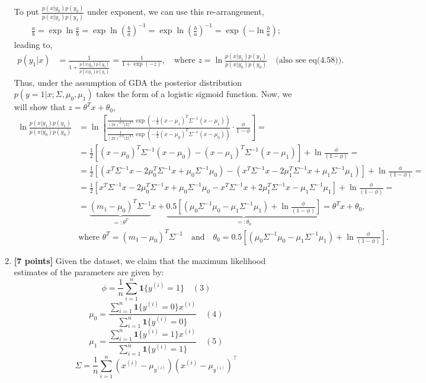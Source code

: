 \documentclass{article}
\begin{document}
\begin{enumerate}[label=\alph*)]
To put $ \frac{p(x|y_0)p(y_0)}{p(x|y_1)p(y_1)}$ under exponent, we can use this re-arrangement, 
 \begin{align*}
     \frac{a}{b} = \exp\ln\frac{a}{b} = \exp\ln\left(\frac{b}{a}\right)^{-1} = \exp\ln\left(\frac{b}{a}\right)^{-1} = \exp\left(-\ln\frac{b}{a}\right);
 \end{align*}
 leading to,
 \begin{align*}
    p(y_1 |x) & =\frac{1}{1+ \frac{p(x|y_0)p(y_0)}{p(x|y_1)p(y_1)}} = \frac{1}{1+\exp(-z)}, \quad\mbox{where } z = \ln\frac{p(x|y_1)p(y_1)}{p(x|y_0)p(y_0)}\quad \mbox{(also see eq(4.58))}.
\end{align*}
 Thus, under the assumption of GDA the posterior distribution $p(y = 1|x; \Sigma, \mu_0, \mu_1)$ takes the form of a logistic sigmoid function. Now, we will show that $z=\theta^Tx +\theta_0$,
\begin{align*}
    \ln\frac{p(x|y_1)p(y_1)}{p(x|y_0)p(y_0)} &= \ln\left[\frac{ \frac{1}{{(2\pi)^{d/2} |\Sigma|^{0.5}}} \exp\left(-\frac{1}{2}(x-\mu_1)^T \Sigma^{-1}(x-\mu_1)\right)}{\frac{1}{{(2\pi)^{d/2} |\Sigma|^{0.5}}} \exp\left(-\frac{1}{2}(x-\mu_0)^T \Sigma^{-1}(x-\mu_0)\right)}\cdot \frac{\phi}{1-\phi} \right]= \\[10pt]
    & = \frac{1}{2}\left[(x-\mu_0)^T\Sigma^{-1}(x-\mu_0) - (x-\mu_1)^T\Sigma^{-1}(x-\mu_1)\right] + \ln\frac{\phi}{(1-\phi)} = \\[10pt]
    & = \frac{1}{2}\left[(x^T\Sigma^{-1}x - 2\mu_0^T\Sigma^{-1}x + \mu_0\Sigma^{-1}\mu_0) - (x^T\Sigma^{-1}x - 2\mu_1^T\Sigma^{-1}x + \mu_1\Sigma^{-1}\mu_1)\right] + \ln\frac{\phi}{(1-\phi)}=\\[10pt]
    &= \frac{1}{2}\left[x^T\Sigma^{-1}x - 2\mu_0^T\Sigma^{-1}x + \mu_0\Sigma^{-1}\mu_0 - x^T\Sigma^{-1}x + 2\mu_1^T\Sigma^{-1}x - \mu_1\Sigma^{-1}\mu_1\right] +\ln\frac{\phi}{(1-\phi)}=\\[10pt]
    &=\underbrace{(m_1-\mu_0)^T\Sigma^{-1}}_{=:\theta^T}x + \underbrace{0.5\left[(\mu_0\Sigma^{-1}\mu_0 - \mu_1\Sigma^{-1}\mu_1) +  \ln\frac{\phi}{(1-\phi)}\right]}_{=:\theta_0}= \theta^Tx + \theta_0,\\[10pt]
    &\mbox{where } \boxed{\theta^T = (m_1-\mu_0)^T\Sigma^{-1}}\quad\mbox{and}\quad \boxed{\theta_0 = 0.5\left[(\mu_0\Sigma^{-1}\mu_0 - \mu_1\Sigma^{-1}\mu_1) +  \ln\frac{\phi}{(1-\phi)}\right].}
\end{align*}





\item \textbf{[7 points]} Given the dataset, we claim that the maximum likelihood estimates of the parameters are given by:
\[ \phi = \frac{1}{n} \sum_{i=1}^{n} \mathbf{1}\{y^{(i)} = 1\} \quad (3) \]
\[ \mu_0 = \frac{\sum_{i=1}^{n} \mathbf{1}\{y^{(i)} = 0\} x^{(i)}}{\sum_{i=1}^{n} \mathbf{1}\{y^{(i)} = 0\}} \quad (4) \]
\[ \mu_1 = \frac{\sum_{i=1}^{n} \mathbf{1}\{y^{(i)} = 1\} x^{(i)}}{\sum_{i=1}^{n} \mathbf{1}\{y^{(i)} = 1\}} \quad (5) \]
\[ \Sigma = \frac{1}{n} \sum_{i=1}^{n} (x^{(i)} - \mu_{y^{(i)}})(x^{(i)} - \mu_{y^{(i)}})^\top \]


\end{enumerate}
\end{document}
